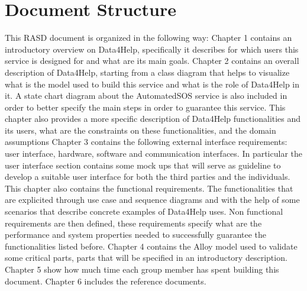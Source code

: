 \section{Document Structure}
This RASD document is organized in the following way:
Chapter 1 contains an introductory overview on Data4Help, specifically it describes for which users this service is designed for and what are its main goals.
\givespace
Chapter 2 contains an overall description of Data4Help, starting from a class diagram that helps to visualize what is the model used to build this service and what is the role of Data4Help in it. A state chart diagram about the AutomatedSOS service is also included in order to better specify the main steps in order to guarantee this service. This chapter also provides a more specific description of Data4Help functionalities and its users, what are the constraints on these functionalities, and the domain assumptions
\givespace
Chapter 3 contains the following external interface requirements: user interface, hardware, software and communication interfaces. In particular the user interface section contains some mock ups that will serve as guideline to develop a suitable user interface for both the third parties and the individuals. 
This chapter also contains the functional requirements. The functionalities that are explicited through use case and sequence diagrams and with the help of some scenarios that describe concrete examples of Data4Help uses.
Non functional requirements are then defined, these requirements specify what are the performance and system properties needed to successfully guarantee the functionalities listed before.
\givespace
Chapter 4 contains the Alloy model used to validate some critical parts, parts that will be specified in an introductory description.
\givespace
Chapter 5 show how much time each group member has spent building this document.
\givespace
Chapter 6 includes the reference documents.